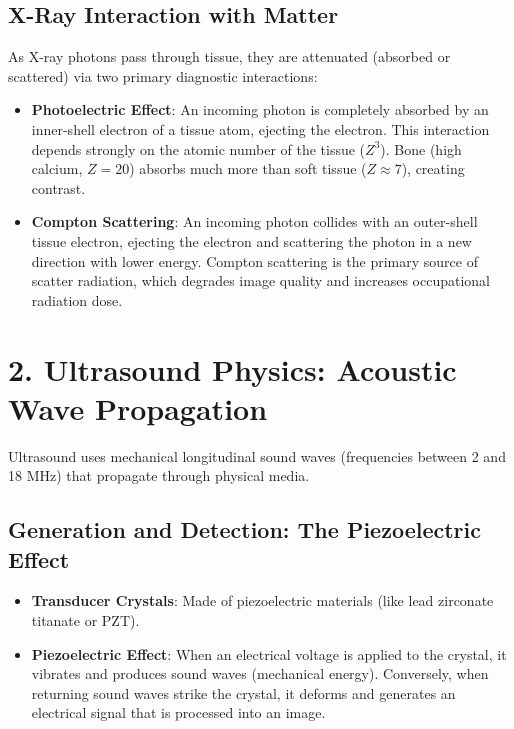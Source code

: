 \subsection*{X-Ray Interaction with Matter}
As X-ray photons pass through tissue, they are attenuated (absorbed or scattered) via two primary diagnostic interactions:
\begin{itemize}
    \item \textbf{Photoelectric Effect}: An incoming photon is completely absorbed by an inner-shell electron of a tissue atom, ejecting the electron. This interaction depends strongly on the atomic number of the tissue ($Z^3$). Bone (high calcium, $Z=20$) absorbs much more than soft tissue ($Z \approx 7$), creating contrast.
    \item \textbf{Compton Scattering}: An incoming photon collides with an outer-shell tissue electron, ejecting the electron and scattering the photon in a new direction with lower energy. Compton scattering is the primary source of scatter radiation, which degrades image quality and increases occupational radiation dose.
\end{itemize}


\section*{2. Ultrasound Physics: Acoustic Wave Propagation}
Ultrasound uses mechanical longitudinal sound waves (frequencies between 2 and 18 MHz) that propagate through physical media.

\subsection*{Generation and Detection: The Piezoelectric Effect}
\begin{itemize}
    \item \textbf{Transducer Crystals}: Made of piezoelectric materials (like lead zirconate titanate or PZT).
    \item \textbf{Piezoelectric Effect}: When an electrical voltage is applied to the crystal, it vibrates and produces sound waves (mechanical energy). Conversely, when returning sound waves strike the crystal, it deforms and generates an electrical signal that is processed into an image.
\end{itemize}

